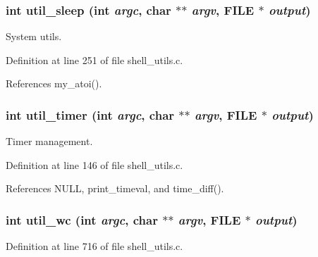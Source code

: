 \subsubsection{\setlength{\rightskip}{0pt plus 5cm}int util\_\-sleep (int {\em argc}, char $\ast$$\ast$ {\em argv}, FILE $\ast$ {\em output})}\label{shell__utils_8c_a4}


System utils. 

Definition at line 251 of file shell\_\-utils.c.

References my\_\-atoi().
\subsubsection{\setlength{\rightskip}{0pt plus 5cm}int util\_\-timer (int {\em argc}, char $\ast$$\ast$ {\em argv}, FILE $\ast$ {\em output})}\label{shell__utils_8c_a3}


Timer management. 

Definition at line 146 of file shell\_\-utils.c.

References NULL, print\_\-timeval, and time\_\-diff().
\subsubsection{\setlength{\rightskip}{0pt plus 5cm}int util\_\-wc (int {\em argc}, char $\ast$$\ast$ {\em argv}, FILE $\ast$ {\em output})}\label{shell__utils_8c_a11}




Definition at line 716 of file shell\_\-utils.c.
